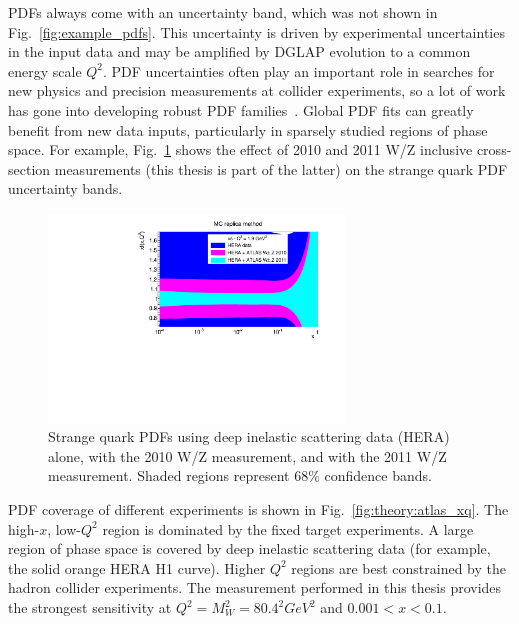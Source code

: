 PDFs always come with an uncertainty band, which was not shown in Fig.~\ref{fig:example_pdfs}. This uncertainty is driven by experimental uncertainties in the input data and may be amplified by DGLAP evolution to a common energy scale $Q^2$. PDF uncertainties often play an important role in searches for new physics and precision measurements at collider experiments, so a lot of work has gone into developing robust PDF families~\cite{Alekhin:2012ig,Aaron:2009aa,Radescu:2011cn,Martin:2009iq,Ball:2012cx}. Global PDF fits can greatly benefit from new data inputs, particularly in sparsely studied regions of phase space. For example, Fig.~\ref{fig:theory:WZ_str_pdf_ratio} shows the effect of 2010 and 2011 W/Z inclusive cross-section measurements (this thesis is part of the latter) on the strange quark PDF uncertainty bands.

\begin{figure}[phtb]
  \begin{center}
    \includegraphics[width=0.7\textwidth]{theory/fig/WZ_str_pdf_ratio}
    \caption{ Strange quark PDFs using deep inelastic scattering data (HERA) alone, with the 2010 W/Z measurement, and with the 2011 W/Z measurement. Shaded regions represent 68\% confidence bands.}
    \label{fig:theory:WZ_str_pdf_ratio}
 \end{center}
\end{figure}

PDF coverage of different experiments is shown in Fig.~\ref{fig:theory:atlas_xq}. The high-$x$, low-$Q^2$ region is dominated by the fixed target experiments. A large region of phase space is covered by deep inelastic scattering data (for example, the solid orange HERA H1 curve). Higher $Q^2$ regions are best constrained by the hadron collider experiments. The measurement performed in this thesis provides the strongest sensitivity at $Q^2=M_{W}^2=80.4^2 GeV^2$ and $0.001<x<0.1$.

